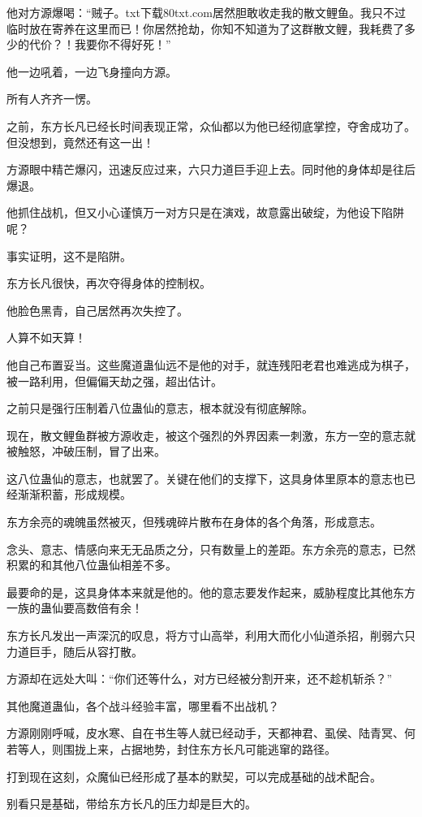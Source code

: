 \begin{this_body}
他对方源爆喝：“贼子。txt下载80txt.com居然胆敢收走我的散文鲤鱼。我只不过临时放在寄养在这里而已！你居然抢劫，你知不知道为了这群散文鲤，我耗费了多少的代价？！我要你不得好死！”

他一边吼着，一边飞身撞向方源。

所有人齐齐一愣。

之前，东方长凡已经长时间表现正常，众仙都以为他已经彻底掌控，夺舍成功了。但没想到，竟然还有这一出！

方源眼中精芒爆闪，迅速反应过来，六只力道巨手迎上去。同时他的身体却是往后爆退。

他抓住战机，但又小心谨慎万一对方只是在演戏，故意露出破绽，为他设下陷阱呢？

事实证明，这不是陷阱。

东方长凡很快，再次夺得身体的控制权。

他脸色黑青，自己居然再次失控了。

人算不如天算！

他自己布置妥当。这些魔道蛊仙远不是他的对手，就连残阳老君也难逃成为棋子，被一路利用，但偏偏天劫之强，超出估计。

之前只是强行压制着八位蛊仙的意志，根本就没有彻底解除。

现在，散文鲤鱼群被方源收走，被这个强烈的外界因素一刺激，东方一空的意志就被触怒，冲破压制，冒了出来。

这八位蛊仙的意志，也就罢了。关键在他们的支撑下，这具身体里原本的意志也已经渐渐积蓄，形成规模。

东方余亮的魂魄虽然被灭，但残魂碎片散布在身体的各个角落，形成意志。

念头、意志、情感向来无无品质之分，只有数量上的差距。东方余亮的意志，已然积累的和其他八位蛊仙相差不多。

最要命的是，这具身体本来就是他的。他的意志要发作起来，威胁程度比其他东方一族的蛊仙要高数倍有余！

东方长凡发出一声深沉的叹息，将方寸山高举，利用大而化小仙道杀招，削弱六只力道巨手，随后从容打散。

方源却在远处大叫：“你们还等什么，对方已经被分割开来，还不趁机斩杀？”

其他魔道蛊仙，各个战斗经验丰富，哪里看不出战机？

方源刚刚呼喊，皮水寒、自在书生等人就已经动手，天都神君、虱侯、陆青冥、何若等人，则围拢上来，占据地势，封住东方长凡可能逃窜的路径。

打到现在这刻，众魔仙已经形成了基本的默契，可以完成基础的战术配合。

别看只是基础，带给东方长凡的压力却是巨大的。


\end{this_body}
